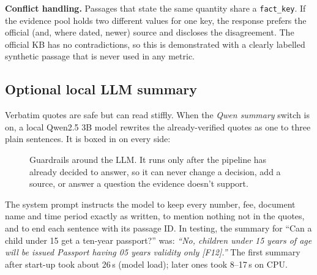 \documentclass[11pt,a4paper]{article}
\begin{document}
\textbf{Conflict handling.} Passages that state the same quantity share a \texttt{fact\_key}. If the evidence pool holds two
different values for one key, the response prefers the official (and, where dated, newer) source and discloses the
disagreement. The official KB has no contradictions, so this is demonstrated with a clearly labelled synthetic passage that is
never used in any metric.

\subsection{Optional local LLM summary}
\label{sec:llm}
Verbatim quotes are safe but can read stiffly. When the \emph{Qwen summary} switch is on, a local Qwen2.5 3B model rewrites the
already-verified quotes as one to three plain sentences. It is boxed in on every side:

\begin{figure}[H]
\centering
{}
\caption{Guardrails around the LLM. It runs only after the pipeline has already decided to answer, so it can never change a
decision, add a source, or answer a question the evidence doesn't support.}
\label{fig:llm}
\end{figure}

The system prompt instructs the model to keep every number, fee, document name and time period exactly as written, to mention
nothing not in the quotes, and to end each sentence with its passage ID. In testing, the summary for ``Can a child under 15 get a
ten-year passport?'' was: \emph{``No, children under 15 years of age will be issued Passport having 05 years validity only
[F12].''} The first summary after start-up took about 26\,s (model load); later ones took 8--17\,s on CPU.
\end{document}
